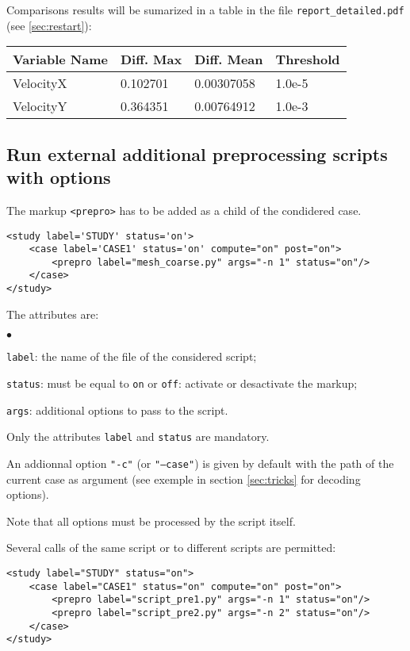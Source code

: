 \documentclass[a4paper,10pt,twoside]{csshortdoc}
\begin{document}
Comparisons results will be sumarized in a table in the file
\texttt{report\_detailed.pdf}  (see \ref{sec:restart}):

\begin{center}
\begin{longtable}{|l|l|l|l|}
\hline
\textbf{Variable Name} &\textbf{Diff. Max} &\textbf{Diff. Mean} &\textbf{Threshold} \\
\hline
\hline
VelocityX &0.102701 &0.00307058 &1.0e-5 \\
\hline
VelocityY &0.364351 &0.00764912 &1.0e-3 \\
\hline
\end{longtable}
\end{center}

\subsection{Run external additional preprocessing scripts with options}\label{sec:prepro}

The markup \texttt{<prepro>} has to be added as a child of the condidered case.

\small
\begin{verbatim}
<study label='STUDY' status='on'>
    <case label='CASE1' status='on' compute="on" post="on">
        <prepro label="mesh_coarse.py" args="-n 1" status="on"/>
    </case>
</study>
\end{verbatim}
\normalsize

The attributes are:
\begin{list}{$\bullet$}{}
\item \texttt{label}: the name of the file of the considered script;
\item \texttt{status}: must be equal to \texttt{on} or \texttt{off}:
activate or desactivate the markup;
\item \texttt{args}: additional options to pass to the script.
\end{list}

Only the attributes \texttt{label} and \texttt{status} are mandatory.

An addionnal option \texttt{"-c"} (or \texttt{"--case"}) is given by
default with the path of the current case as argument (see exemple in
section \ref{sec:tricks} for decoding options).

Note that all options must be processed by the script itself.

Several calls of the same script or to different scripts are permitted:
\small
\begin{verbatim}
<study label="STUDY" status="on">
    <case label="CASE1" status="on" compute="on" post="on">
        <prepro label="script_pre1.py" args="-n 1" status="on"/>
        <prepro label="script_pre2.py" args="-n 2" status="on"/>
    </case>
</study>
\end{verbatim}
\normalsize
\end{document}
